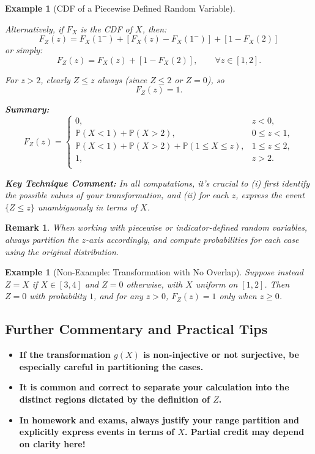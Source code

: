 \documentclass[12pt]{article}
\newtheorem{example}[definition]{Example}
\newtheorem{remark}[definition]{Remark}
\begin{document}
\begin{example}[CDF of a Piecewise Defined Random Variable]
\begin{description}[leftmargin=1.8em, style=sameline, labelsep=0.6em]
        \emph{Alternatively, if $F_X$ is the CDF of $X$, then:}
        \[
            F_Z(z) = F_X(1^-) + [F_X(z) - F_X(1^-)] + [1 - F_X(2)]
        \]
        or simply:
        \[
            F_Z(z) = F_X(z) + [1 - F_X(2)],\qquad \forall z \in [1,2].
        \]

    \item[\underline{Case 4: $z > 2$}]
        For $z > 2$, clearly $Z \leq z$ always (since $Z \leq 2$ or $Z = 0$), so
        \[
            F_Z(z) = 1.
        \]

    \end{description}

    \textbf{Summary:}
    \[
    F_Z(z) = \begin{cases}
        0, & z < 0, \\
        \mathbb{P}(X < 1) + \mathbb{P}(X > 2), & 0 \leq z < 1, \\
        \mathbb{P}(X < 1) + \mathbb{P}(X > 2) + \mathbb{P}(1 \leq X \leq z), & 1 \leq z \leq 2, \\
        1, & z > 2. \\
    \end{cases}
    \]
    
    \textbf{Key Technique Comment:} In all computations, it's crucial to (i) first identify the possible values of your transformation, and (ii) for each $z$, express the event $\{Z \leq z\}$ unambiguously in terms of $X$.
\end{example}
\medskip

\begin{remark}
    When working with piecewise or indicator-defined random variables, always partition the $z$-axis accordingly, and compute probabilities for each case using the original distribution.
\end{remark}

\begin{example}[Non-Example: Transformation with No Overlap]
    Suppose instead $Z = X$ if $X \in [3,4]$ and $Z = 0$ otherwise, with $X$ uniform on $[1,2]$. Then $Z=0$ with probability $1$, and for any $z > 0$, $F_Z(z) = 1$ only when $z \geq 0$.
\end{example}

\subsection{Further Commentary and Practical Tips}

\begin{itemize}
    \item \textbf{If the transformation $g(X)$ is non-injective or not surjective, be especially careful in partitioning the cases.}
    \item \textbf{It is common and correct to separate your calculation into the distinct regions dictated by the definition of $Z$.}
    \item \textbf{In homework and exams, always justify your range partition and explicitly express events in terms of $X$. Partial credit may depend on clarity here!}
\end{itemize}
\end{document}
